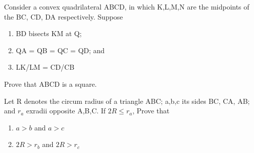 \item Consider a convex quadrilateral ABCD, in which K,L,M,N are the midpoints of the BC, CD, DA respectively. Suppose
\begin{enumerate}
\item BD bisects KM at Q;
\item QA = QB = QC = QD; and
\item LK/LM = CD/CB
\end{enumerate}
Prove that ABCD is a square.

\item Let R denotes the circum radius of a triangle ABC; a,b,c its sides BC, CA, AB; and $r_a$ exradii opposite A,B,C. If $2R \leq r_a$, Prove that 
\begin{enumerate}
\item $a > b$ and $a > c$
\item $2R > r_b$ and $2R > r_c$
\end{enumerate}























